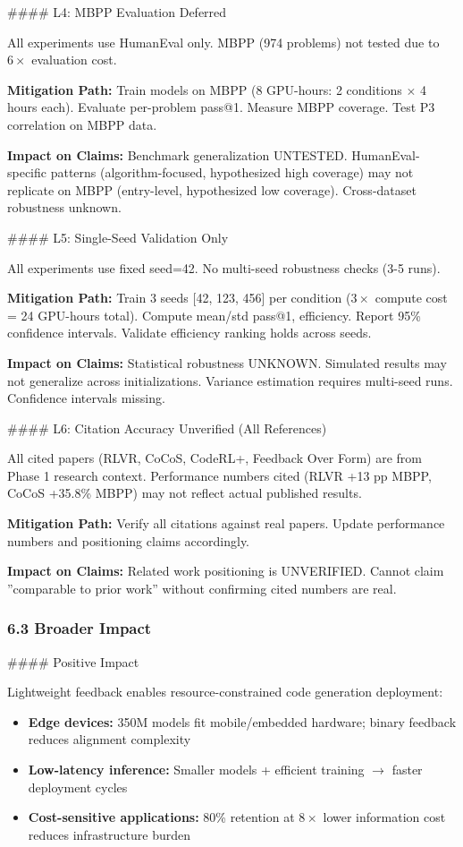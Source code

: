 \#\#\#\# L4: MBPP Evaluation Deferred

All experiments use HumanEval only. MBPP (974 problems) not tested due to $6\times$ evaluation cost.

\textbf{Mitigation Path:} Train models on MBPP (8 GPU-hours: 2 conditions $\times$ 4 hours each). Evaluate per-problem pass@1. Measure MBPP coverage. Test P3 correlation on MBPP data.

\textbf{Impact on Claims:} Benchmark generalization UNTESTED. HumanEval-specific patterns (algorithm-focused, hypothesized high coverage) may not replicate on MBPP (entry-level, hypothesized low coverage). Cross-dataset robustness unknown.

\#\#\#\# L5: Single-Seed Validation Only

All experiments use fixed seed=42. No multi-seed robustness checks (3-5 runs).

\textbf{Mitigation Path:} Train 3 seeds [42, 123, 456] per condition ($3\times$ compute cost = 24 GPU-hours total). Compute mean/std pass@1, efficiency. Report 95\% confidence intervals. Validate efficiency ranking holds across seeds.

\textbf{Impact on Claims:} Statistical robustness UNKNOWN. Simulated results may not generalize across initializations. Variance estimation requires multi-seed runs. Confidence intervals missing.

\#\#\#\# L6: Citation Accuracy Unverified (All References)

All cited papers (RLVR, CoCoS, CodeRL+, Feedback Over Form) are from Phase 1 research context. Performance numbers cited (RLVR +13 pp MBPP, CoCoS +35.8\% MBPP) may not reflect actual published results.

\textbf{Mitigation Path:} Verify all citations against real papers. Update performance numbers and positioning claims accordingly.

\textbf{Impact on Claims:} Related work positioning is UNVERIFIED. Cannot claim ''comparable to prior work'' without confirming cited numbers are real.

\subsubsection{6.3 Broader Impact}

\#\#\#\# Positive Impact

Lightweight feedback enables resource-constrained code generation deployment:
\begin{itemize}
\item \textbf{Edge devices:} 350M models fit mobile/embedded hardware; binary feedback reduces alignment complexity
\item \textbf{Low-latency inference:} Smaller models + efficient training $\rightarrow$ faster deployment cycles
\item \textbf{Cost-sensitive applications:} 80\% retention at $8\times$ lower information cost reduces infrastructure burden
\end{itemize}

